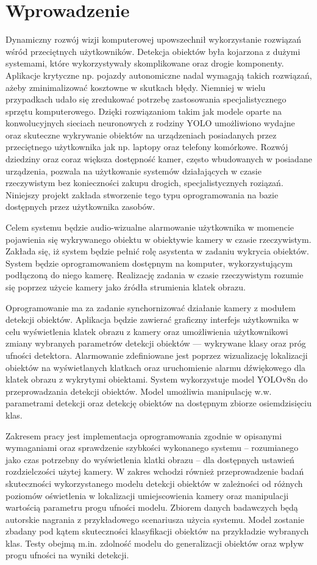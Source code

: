 \chapter{Wprowadzenie}
Dynamiczny rozwój wizji komputerowej upowszechnił wykorzystanie rozwiązań wśród przeciętnych użytkowników. Detekcja obiektów była kojarzona z dużymi systemami, które wykorzystywały skomplikowane oraz drogie komponenty. Aplikacje krytyczne np. pojazdy autonomiczne nadal wymagają takich rozwiązań, ażeby zminimalizować kosztowne w skutkach błędy. Niemniej w wielu przypadkach udało się zredukować potrzebę  zastosowania specjalistycznego sprzętu komputerowego. Dzięki rozwiązaniom takim jak modele oparte na konwolucyjnych sieciach neuronowych z rodziny YOLO umożliwiono wydajne oraz skuteczne wykrywanie obiektów na urządzeniach posiadanych przez przeciętnego użytkownika jak np. laptopy oraz telefony komórkowe. Rozwój dziedziny oraz coraz większa dostępność kamer, często wbudowanych w posiadane urządzenia, pozwala na użytkowanie systemów działających w czasie rzeczywistym bez konieczności zakupu drogich, specjalistycznych roziązań. Niniejszy projekt zakłada stworzenie tego typu oprogramowania na bazie dostępnych przez użytkownika zasobów. 

Celem systemu będzie audio-wizualne alarmowanie użytkownika w momencie pojawienia się wykrywanego obiektu w obiektywie kamery w czasie rzeczywistym. Zakłada się, iż system będzie pełnić rolę asystenta w zadaniu wykrycia obiektów. 
System będzie oprogramowaniem dostępnym na komputer, wykorzystującym podłączoną do niego kamerę. Realizację zadania w czasie rzeczywistym rozumie się poprzez użycie kamery jako źródła strumienia klatek obrazu. 

Oprogramowanie ma za zadanie synchornizować działanie kamery z modułem detekcji obiektów. Aplikacja będzie zawierać graficzny interfejs użytkownika w celu wyświetlenia klatek obrazu z kamery oraz umożliwienia użytkownikowi zmiany wybranych parametrów detekcji obiektów --- wykrywane klasy oraz próg ufności detektora. Alarmowanie zdefiniowane jest poprzez wizualizację lokalizacji obiektów na wyświetlanych klatkach oraz uruchomienie alarmu dźwiękowego dla klatek obrazu z wykrytymi obiektami. System wykorzystuje model YOLOv8n do przeprowadzania detekcji obiektów. Model umożliwia manipulację w.w. parametrami detekcji oraz detekcję obiektów na dostępnym zbiorze osiemdzisięciu klas.  

Zakresem pracy jest implementacja oprogramowania zgodnie w opisanymi wymaganiami oraz sprawdzenie szybkości wykonanego systemu -- rozumianego jako czas potrzebny do wyświetlenia klatki obrazu -- dla dostępnych ustawień rozdzielczości użytej kamery.   
W zakres wchodzi również przeprowadzenie badań skuteczności wykorzystanego modelu detekcji obiektów w zależności od różnych poziomów oświetlenia w lokalizacji umiejscowienia kamery oraz manipulacji wartością parametru progu ufności modelu. Zbiorem danych badawczych będą autorskie nagrania z przykładowego scenariusza użycia systemu. Model zostanie zbadany pod kątem skuteczności klasyfikacji obiektów na przykładzie wybranych klas. Testy obejmą m.in. zdolność modelu do generalizacji obiektów oraz wpływ progu ufności na wyniki detekcji.